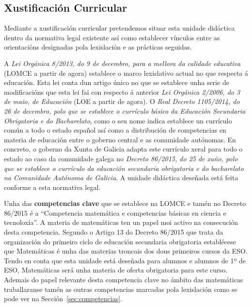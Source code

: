 \subsection{Xustificación Curricular}
Mediante a xustificación curricular pretendemos situar esta unidade didáctica dentro da normativa legal existente así como establecer vínculos entre as orientacións designadas pola lexislación e as prácticas seguidas.

A \emph{Lei Orgánica 8/2013, do 9 de decembro, para a mellora da calidade educativa} (LOMCE a partir de agora) establece o marco lexislativo actual no que respecta á educación. Esta lei conta dun artigo único no que se establece unha serie de modificacións que esta lei fai con respecto á anterior \emph{Lei Orgánica 2/2006, do 3 de maio, de Educación} (LOE a partir de agora). O \emph{Real Decreto 1105/2014, do 26 de decembro, polo que se establece o currículo básico da Educación Secundaria Obrigatoria e do Bacharelato}, como o seu nome indica establece un currículo común a todo o estado español así como a distribución de competencias en materia de educación entre o goberno central e as comunidade autónomas. En concreto, o goberno da Xunta de Galicia adapta este currículo xeral para todo o estado ao caso da comunidade galega no \emph{Decreto 86/2015, do 25 de xuño, polo que se establece o currículo da educación secundaria obrigatoria e do bacharelato na Comunidade Autónoma de Galicia}. A unidade didáctica deseñada está feita conforme a esta normativa legal.

Unha das \textbf{competencias clave} que se establece na LOMCE e tamén no Decreto 86/2015 é a ``Competencia matemática e competencias básicas en ciencia e tecnoloxía''. A materia de matemáticas ten un papel moi activo na consecución desta competencia. Segundo o Artigo 13 do Decreto 86/2015 que trata da organización do primeiro ciclo de educación secundaria obrigatoria establécese que Matemáticas é unha das materias troncais dos dous primeiros cursos da ESO. Tendo en conta que esta unidade está deseñada para alumnos e alumnos de 1º de ESO, Matemáticas será unha materia de oferta obrigatoria para este curso. Ademais do papel relevante desta competencia clave no ámbito das matemáticas traballaranse tamén as outras competencias marcadas pola lexislación como se pode ver na Sección~\ref{sec:competencias}.

